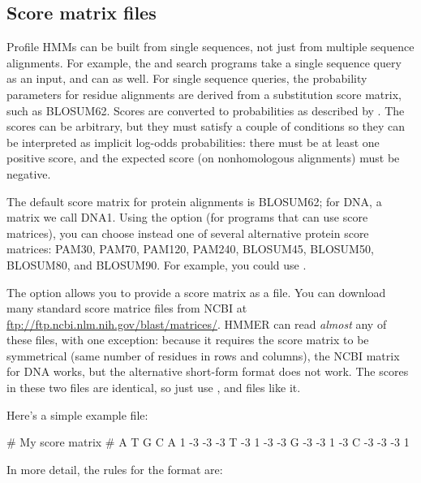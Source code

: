 
\subsection{Score matrix files}

Profile HMMs can be built from single sequences, not just from
multiple sequence alignments. For example, the  and
 search programs take a single sequence query as an
input, and  can as well. For single sequence queries, the
probability parameters for residue alignments are derived from a
substitution score matrix, such as BLOSUM62. Scores are converted to
probabilities as described by \citet{Altschul91}. The scores can be
arbitrary, but they must satisfy a couple of conditions so they 
can be interpreted as implicit log-odds probabilities: there must be
at least one positive score, and the expected score (on nonhomologous
alignments) must be negative.

The default score matrix for protein alignments is BLOSUM62; for DNA,
a matrix we call DNA1. Using the  option (for programs that
can use score matrices), you can choose instead one of several
alternative protein score matrices: PAM30, PAM70, PAM120, PAM240,
BLOSUM45, BLOSUM50, BLOSUM80, and BLOSUM90. For example, you could use
.

The  option allows you to provide a score matrix as a
file. You can download many standard score matrice files from NCBI at
\url{ftp://ftp.ncbi.nlm.nih.gov/blast/matrices/}. HMMER can read
\emph{almost} any of these files, with one exception: because it
requires the score matrix to be symmetrical (same number of residues
in rows and columns), the NCBI  matrix for DNA works,
but the alternative short-form format  does not
work. The scores in these two files are identical, so just use
, and files like it.

Here's a simple example file:

\begin{cchunk}
# My score matrix
#
   A  T  G  C
A  1 -3 -3 -3
T -3  1 -3 -3
G -3 -3  1 -3
C -3 -3 -3  1
\end{cchunk}

In more detail, the rules for the format are:

